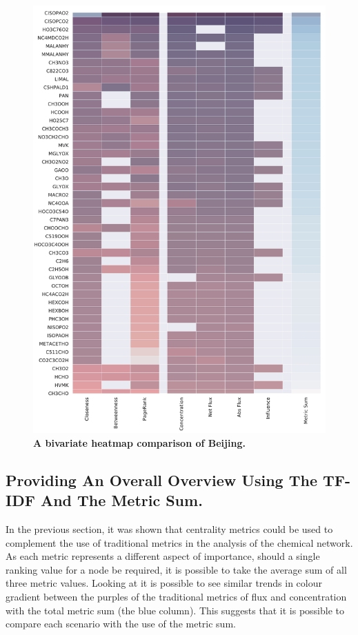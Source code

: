 \begin{figure}[H]
     \centering
         \includegraphics[width=.95\textwidth]{figures_c3/mlpregressor/aphh_Beijing.pdf}
        \caption{ \textbf{A bivariate heatmap comparison of Beijing.} }
        \label{fig:heatbj}
\end{figure}



%
%

\subsection{Providing An Overall Overview Using The TF-IDF And The Metric Sum.}
In the previous section, it was shown that centrality metrics could be used to complement the use of traditional metrics in the analysis of the chemical network. As each metric represents a different aspect of importance, should a single ranking value for a node be required, it is possible to take the average sum of all three metric values. Looking at  it is possible to see similar trends in colour gradient between the purples of the traditional metrics of flux and concentration with the total metric sum (the blue column). This suggests that it is possible to compare each scenario with the use of the metric sum.

